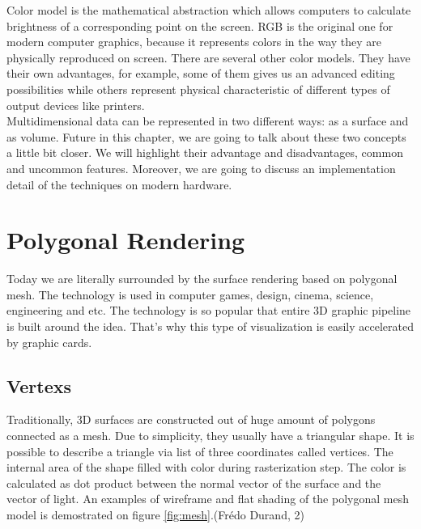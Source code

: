 \documentclass[twoside, english, 11pt]{report}
\begin{document}
Color model is the mathematical abstraction which allows computers to calculate brightness of a corresponding point on the screen. RGB is the original one for modern computer graphics, because it represents colors in the way they are physically reproduced on screen. There are several other color models. They have their own advantages, for example, some of them gives us an advanced editing possibilities while others represent physical characteristic of different types of output devices like printers.\\

Multidimensional data can be represented in two different ways: as a surface and as volume. Future in this chapter, we are going to talk about these two concepts a little bit closer. We will highlight their advantage and disadvantages, common and uncommon features. Moreover, we are going to discuss an implementation detail of the techniques on modern hardware.


\section{Polygonal Rendering}

Today we are literally surrounded by the surface rendering based on polygonal mesh. The technology is used in computer games, design, cinema, science, engineering and etc. The technology is so popular that entire 3D graphic pipeline is built around the idea. That's why this type of visualization is easily accelerated by graphic cards.\\

\subsection{Vertexs}
Traditionally, 3D surfaces are constructed out of huge amount of polygons connected as a mesh. Due to simplicity, they usually have a triangular shape. It is possible to describe a triangle via list of three coordinates called vertices. The internal area of the shape filled with color during rasterization step. The color is calculated as dot product between the normal vector of the surface and the vector of light. An examples of wireframe and flat shading of the polygonal mesh model is demostrated on figure \ref{fig:mesh}.(Frédo Durand, 2)
\end{document}
